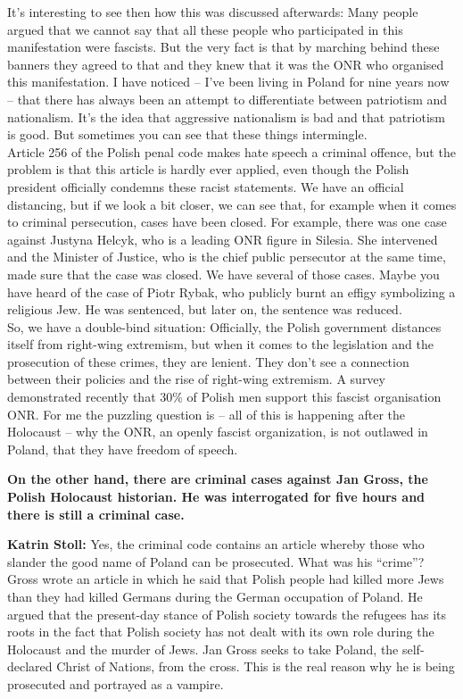 It’s interesting to see then how this was discussed afterwards: Many people argued that we cannot say that all these people who participated in this manifestation were fascists. But the very fact is that by marching behind these banners they agreed to that and they knew that it was the ONR who organised this manifestation. I have noticed – I’ve been living in Poland for nine years now – that there has always been an attempt to differentiate between patriotism and nationalism. It’s the idea that aggressive nationalism is bad and that patriotism is good. But sometimes you can see that these things intermingle.\\ 
Article 256 of the Polish penal code makes hate speech a criminal offence, but the problem is that this article is hardly ever applied, even though the Polish president officially condemns these racist statements. We have an official distancing, but if we look a bit closer, we can see that, for example when it comes to criminal persecution, cases have been closed. For example, there was one case against Justyna Helcyk, who is a leading ONR figure in Silesia. She intervened and the Minister of Justice, who is the chief public persecutor at the same time, made sure that the case was closed. We have several of those cases. Maybe you have heard of the case of Piotr Rybak, who publicly burnt an effigy symbolizing a religious Jew. He was sentenced, but later on, the sentence was reduced.\\ 
So, we have a double-bind situation: Officially, the Polish government distances itself from right-wing extremism, but when it comes to the legislation and the prosecution of these crimes, they are lenient. They don’t see a connection between their policies and the rise of right-wing extremism. A survey demonstrated recently that 30\% of Polish men support this fascist organisation ONR. For me the puzzling question is – all of this is happening after the Holocaust – why the ONR, an openly fascist organization, is not outlawed in Poland, that they have freedom of speech.  

\textbf{On the other hand, there are criminal cases against Jan Gross, the Polish Holocaust historian. He was interrogated for five hours and there is still a criminal case.} 

\textbf{Katrin Stoll:} Yes, the criminal code contains an article whereby those who slander the good name of Poland can be prosecuted. What was his ``crime''? Gross wrote an article in which he said that Polish people had killed more Jews than they had killed Germans during the German occupation of Poland. He argued that the present-day stance of Polish society towards the refugees has its roots in the fact that Polish society has not dealt with its own role during the Holocaust and the murder of Jews. Jan Gross seeks to take Poland, the self-declared Christ of Nations, from the cross. This is the real reason why he is being prosecuted and portrayed as a vampire.  

